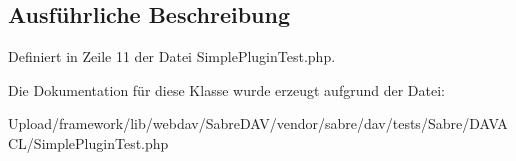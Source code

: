 \subsection{Ausführliche Beschreibung}


Definiert in Zeile 11 der Datei Simple\+Plugin\+Test.\+php.



Die Dokumentation für diese Klasse wurde erzeugt aufgrund der Datei\+:\begin{DoxyCompactItemize}
\item 
Upload/framework/lib/webdav/\+Sabre\+D\+A\+V/vendor/sabre/dav/tests/\+Sabre/\+D\+A\+V\+A\+C\+L/Simple\+Plugin\+Test.\+php\end{DoxyCompactItemize}

